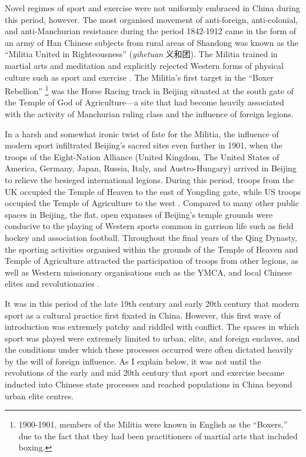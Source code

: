 \begin{CJK}{UTF8}{gbsn}
Novel regimes of sport and exercise were not uniformly embraced in China during this period, however.  The most organised movement of anti-foreign, anti-colonial, and anti-Manchurian resistance during the period 1842-1912 came in the form of an army of Han Chinese subjects from rural areas of Shandong was known as the ``Militia United in Righteousness'' (\textit{yihetuan} 义和团).  The Militia trained in martial arts and meditation and explicitly rejected Western forms of physical culture such as sport and exercise \citep{Brownell2008}.  The Militia's first target in the ``Boxer Rebellion''
  \footnote{1900-1901, members of the Militia were known in English as the ``Boxers,'' due to the fact that they had been practitioners of martial arts that included boxing.}
was the Horse Racing track in Beijing situated at the south gate of the Temple of God of Agriculture---a site that had become heavily associated with the activity of Manchurian ruling class and the influence of foreign legions.

In a harsh and somewhat ironic twist of fate for the Militia, the influence of modern sport infiltrated Beijing's sacred sites even further in 1901, when the troops of the Eight-Nation Alliance (United Kingdom, The United States of America, Germany, Japan, Russia, Italy, and Austro-Hungary) arrived in Beijing to relieve the besieged international legions.  During this period, troops from the UK occupied the Temple of Heaven to the east of Yongding gate, while US troops occupied the Temple of Agriculture to the west \citep{Brownell2008}. Compared to many other public spaces in Beijing, the flat, open expanses of Beijing's temple grounds were conducive to the playing of Western sports common in garrison life such as field hockey and association football.  Throughout the final years of the Qing Dynasty, the sporting activities organised within the grounds of the Temple of Heaven and Temple of Agriculture attracted the participation of troops from other legions, as well as Western missionary organisations such as the YMCA, and local Chinese elites and revolutionaries \citep{Steel1985}.

It was in this period of the late 19th century and early 20th century that modern sport as a cultural practice first fixated in China. However, this first wave of introduction was extremely patchy and riddled with conflict.  The spaces in which sport was played were extremely limited to urban, elite, and foreign enclaves, and the conditions under which these processes occurred were often dictated heavily by the will of foreign influence.  As I explain below, it was not until the revolutions of the early and mid 20th century that sport and exercise became inducted into Chinese state processes and reached populations in China beyond urban elite centres.


\end{CJK}
